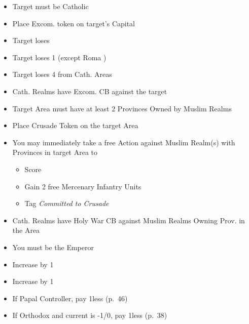 \documentclass[10pt]{article}
\begin{document}
\begin{itemize}
	\item Target must be Catholic
	\item Place Excom. token on target's Capital
	\item Target loses 
	\item Target loses 1 \cardinal (except Roma \cardinal)
	\item Target loses 4 \influence from Cath. Areas
	\item Cath. Realms have Excom. CB against the target
\end{itemize}

\begin{itemize}
	\item Target Area must have at least 2 Provinces Owned by Muslim Realms
	\item Place Crusade Token on the target Area
	\item You may immediately take a free  Action against Muslim Realm(s) with Provinces in target Area to
	\begin{itemize}
		\item Score 
		\item Gain 2 free Mercenary Infantry Units
		\item Tag \emph{Committed to Crusade}
	\end{itemize}
	\item Cath. Realms have Holy War CB against Muslim Realms Owning Prov. in the Area	
\end{itemize}

\begin{itemize}
	\item You must be the Emperor
	\item Increase \authority by 1
\end{itemize}

\begin{itemize}
	\item Increase \stability by 1
	\item If Papal Controller, pay 1\adminpower less (p.~46)
	\item If Orthodox and current \stability is -1/0, pay 1\adminpower less (p.~38)
\end{itemize}
\end{document}
